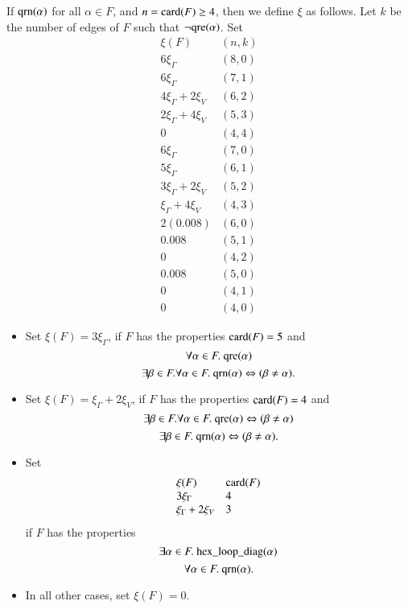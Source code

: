 If ${\operatorname{qrn}}(\alpha)$ for all $\alpha\in F$, and $n={\operatorname{card}}(F)\ge
4$, then we define $\xi$ as follows.  Let $k$ be the number of
edges of $F$ such that $\neg{\operatorname{qre}}(\alpha)$.  Set
    $$
    \begin{array}{lll}
    \xi(F) & (n,k)\\
    6 \xi_\Gamma & (8,0)\\
    6 \xi_\Gamma & (7,1)\\
    4 \xi_\Gamma + 2 \xi_V & (6,2)\\
    2 \xi_\Gamma + 4 \xi_V & (5,3)\\
    0 & (4,4)\\
    6 \xi_\Gamma & (7,0)\\
    5 \xi_\Gamma & (6,1)\\
    3\xi_\Gamma + 2 \xi_V & (5,2)\\
    \xi_\Gamma + 4\xi_V & (4,3)\\
    2(0.008) & (6,0) \\
    0.008 & (5,1) \\
    0 & (4,2) \\
    0.008 & (5,0) \\
    0 & (4,1) \\
    0 & (4,0)
    \end{array}
    $$
%
\begin{itemize}
\item Set
    $\xi(F) = 3\xi_\Gamma$, if $F$ has the properties ${\operatorname{card}}(F)=5$
    and
    $$\forall\alpha\in F.\
    {\operatorname{qre}}(\alpha)$$
    $$
    \exists\beta\in F.\forall\alpha\in F.\
    {\operatorname{qrn}}(\alpha)\Leftrightarrow
(\beta\ne\alpha).$$
%
%
\item Set $\xi(F) = \xi_\Gamma + 2\xi_V$, if $F$ has the
properties
    ${\operatorname{card}}(F)=4$ and
    $$\exists\beta\in F.\forall\alpha\in F.\
    {\operatorname{qre}}(\alpha)\Leftrightarrow (\beta\ne\alpha)
    $$
    $$\exists\beta\in F.\ \op{qrn}(\alpha)\Leftrightarrow
    (\beta\ne\alpha).$$
\item Set
    $$
    \begin{array}{lll}
    \xi(F) & {\operatorname{card}}(F)\\
    3 \xi_\Gamma & 4\\
     \xi_\Gamma + 2\xi_V & 3\\
    \end{array}
    $$
if $F$ has the properties
    $$
    \exists\alpha\in F.\ \op{hex\_loop\_diag}(\alpha)
    $$
    $$
    \forall\alpha\in F.\ \op{qrn}(\alpha).
    $$
\item In all other cases, set $\xi(F)=0$.
\end{itemize}


